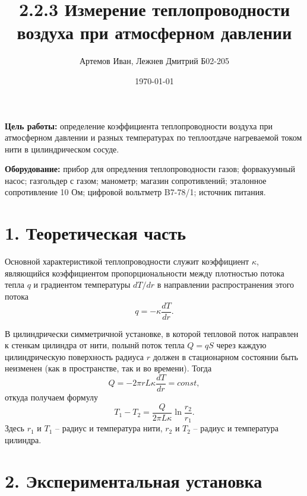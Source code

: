 \documentclass[a4paper,12pt]{article} %
\author{Артемов Иван, Лежнев Дмитрий Б02-205}
\title{2.2.3 Измерение теплопроводности воздуха при атмосферном давлении}
\date{\today}
\begin{document}
\maketitle

\textbf{Цель работы:} определение коэффициента теплопроводности воздуха при атмосферном давлении и разных температурах по теплоотдаче нагреваемой током нити в цилиндрическом сосуде.

\textbf{Оборудование:} прибор для опредления теплопроводности газов; форвакуумный насос; газгольдер с газом; манометр; магазин сопротивлений; эталонное сопротивление 10 Ом; цифровой вольтметр B7-78/1; источник питания.


\section*{1. Теоретическая часть}

	Основной характеристикой теплопроводности служит коэффициент $\kappa$, являющийся коэффициентом пропорциональности между плотностью потока тепла $q$ и градиентом температуры $dT/dr$ в направлении распространения этого потока
\begin{equation}
	q = -\kappa \frac{dT}{dr}.
\end{equation}

	В цилиндрически симметричной установке, в которой тепловой поток направлен к стенкам цилиндра от нити, полынй поток тепла $Q = qS$ через каждую цилиндрическую поверхность радиуса $r$ должен в стационарном состоянии быть неизменен (как в пространстве, так и во времени). Тогда
\begin{equation}
	Q = -2\pi rL\kappa \frac{dT}{dr} = const,	
\end{equation}
откуда получаем формулу
\begin{equation}
	\label{formula}
	T_1 - T_2 = \frac{Q}{2\pi L\kappa} \ln \frac{r_2}{r_1}.
\end{equation}
Здесь $r_1$ и $T_1$ -- радиус и температура нити, $r_2$ и $T_2$ -- радиус и температура цилиндра.


\section*{2. Экспериментальная установка}
\end{document}
